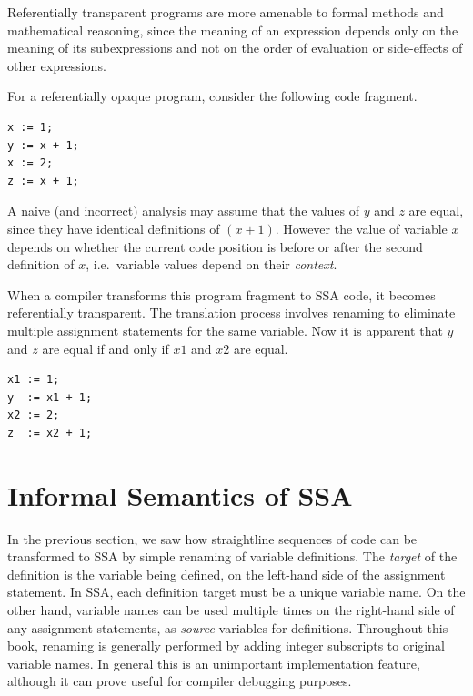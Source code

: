 Referentially transparent programs are more amenable to 
formal methods and mathematical reasoning, since
the meaning of an expression depends only on the
meaning of its subexpressions
and not on the order of evaluation or
side-effects of other expressions.

For a referentially opaque program, consider
the following code fragment.
\begin{verbatim}
x := 1;
y := x + 1;
x := 2;
z := x + 1;
\end{verbatim}
A naive (and incorrect) analysis may assume that the values
of $y$ and $z$ are equal, since they have identical 
definitions of $(x+1)$. 
However the value of variable $x$ depends on whether
the current code position is before or after the second definition
of $x$, i.e.\ variable values depend on their \textit{context}.

When a compiler transforms this program fragment to SSA code,
it becomes referentially transparent. The translation process
involves renaming to  
eliminate multiple assignment statements for the same variable.
Now it is
apparent that $y$ and $z$ are equal if and only if $x1$ and $x2$
are equal.
\begin{verbatim}
x1 := 1;
y  := x1 + 1;
x2 := 2;
z  := x2 + 1;
\end{verbatim}







\section{Informal Semantics of SSA}



In the previous section, we saw how straightline sequences of code
can be transformed to SSA by simple renaming of variable definitions.
The \textit{target} of the definition is the variable being defined, on the
left-hand side of the assignment statement.
In SSA, each definition target must be a unique variable name.
On the other hand, variable names can be used multiple times
on the right-hand side of any assignment statements, as 
\textit{source} variables for definitions.
Throughout this book, renaming is generally performed by 
adding integer subscripts to original variable names.
In general this is an unimportant implementation feature,
although it can prove useful for compiler debugging purposes.

